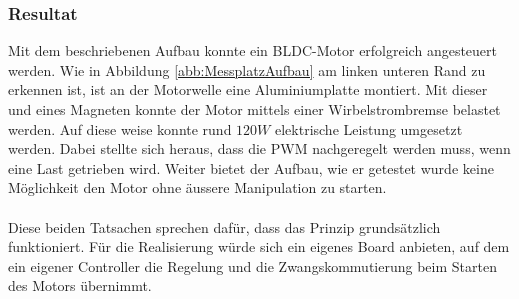 \subsubsection{Resultat}
\label{chap:VersuchsResultat}
\fi
Mit dem beschriebenen Aufbau konnte ein BLDC-Motor erfolgreich angesteuert werden. Wie in Abbildung
 \ref{abb:MessplatzAufbau} am linken unteren Rand zu erkennen ist, ist an der Motorwelle eine 
 Aluminiumplatte montiert. Mit dieser und eines Magneten konnte der Motor mittels einer Wirbelstrombremse 
 belastet werden. Auf diese weise konnte rund $120 W$ elektrische Leistung umgesetzt werden. Dabei 
 stellte sich heraus, dass die PWM nachgeregelt werden muss, wenn eine Last getrieben wird. Weiter 
 bietet der Aufbau, wie er getestet wurde keine Möglichkeit den Motor ohne äussere Manipulation zu 
 starten.\\
\\
Diese beiden Tatsachen sprechen dafür, dass das Prinzip grundsätzlich funktioniert. Für die Realisierung 
würde sich ein eigenes Board anbieten, auf dem ein eigener Controller die Regelung und die Zwangskommutierung beim Starten des Motors übernimmt.
